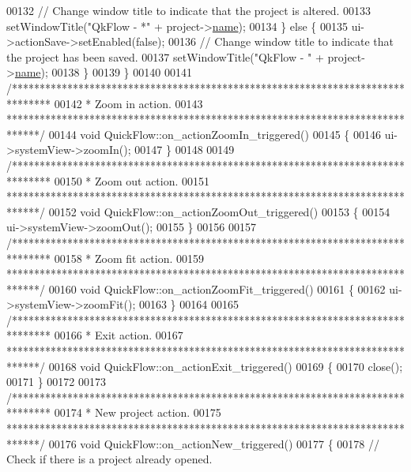 \begin{DoxyCode}
00132     \textcolor{comment}{// Change window title to indicate that the project is altered.}
00133     setWindowTitle(\textcolor{stringliteral}{"QkFlow - *"} + project->\hyperlink{class_project_a82dd2d1bc38f9fd08c9a811fcaa76b38}{name});
00134   \} \textcolor{keywordflow}{else} \{
00135     ui->actionSave->setEnabled(\textcolor{keyword}{false});
00136     \textcolor{comment}{// Change window title to indicate that the project has been saved.}
00137     setWindowTitle(\textcolor{stringliteral}{"QkFlow - "} + project->\hyperlink{class_project_a82dd2d1bc38f9fd08c9a811fcaa76b38}{name});
00138   \}
00139 \}
00140 
00141 \textcolor{comment}{/*******************************************************************************}
00142 \textcolor{comment}{ * Zoom in action.}
00143 \textcolor{comment}{ ******************************************************************************/}
00144 \textcolor{keywordtype}{void} QuickFlow::on\_actionZoomIn\_triggered()
00145 \{
00146   ui->systemView->zoomIn();
00147 \}
00148 
00149 \textcolor{comment}{/*******************************************************************************}
00150 \textcolor{comment}{ * Zoom out action.}
00151 \textcolor{comment}{ ******************************************************************************/}
00152 \textcolor{keywordtype}{void} QuickFlow::on\_actionZoomOut\_triggered()
00153 \{
00154   ui->systemView->zoomOut();
00155 \}
00156 
00157 \textcolor{comment}{/*******************************************************************************}
00158 \textcolor{comment}{ * Zoom fit action.}
00159 \textcolor{comment}{ ******************************************************************************/}
00160 \textcolor{keywordtype}{void} QuickFlow::on\_actionZoomFit\_triggered()
00161 \{
00162   ui->systemView->zoomFit();
00163 \}
00164 
00165 \textcolor{comment}{/*******************************************************************************}
00166 \textcolor{comment}{ * Exit action.}
00167 \textcolor{comment}{ ******************************************************************************/}
00168 \textcolor{keywordtype}{void} QuickFlow::on\_actionExit\_triggered()
00169 \{
00170   close();
00171 \}
00172 
00173 \textcolor{comment}{/*******************************************************************************}
00174 \textcolor{comment}{ * New project action.}
00175 \textcolor{comment}{ ******************************************************************************/}
00176 \textcolor{keywordtype}{void} QuickFlow::on\_actionNew\_triggered()
00177 \{
00178   \textcolor{comment}{// Check if there is a project already opened.}

\end{DoxyCode}
